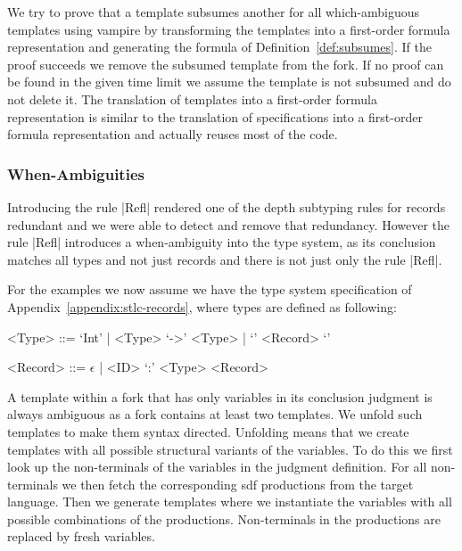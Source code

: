 We try to prove that a template subsumes another for all
which-ambiguous templates using vampire by transforming the templates
into a first-order formula representation and generating the formula
of Definition~\ref{def:subsumes}. If the proof succeeds we remove the
subsumed template from the fork. If no proof can be found in the given
time limit we assume the template is not subsumed and do not delete
it. The translation of templates into a first-order formula
representation is similar to the translation of specifications into a
first-order formula representation and actually reuses most of the
code.

\subsubsection{When-Ambiguities}
Introducing the rule \code|Refl| rendered one of the depth subtyping
rules for records redundant and we were able to detect and remove that
redundancy. However the rule \code|Refl| introduces a when-ambiguity
into the type system, as its conclusion matches all types and not just
records and there is not just only the rule \code|Refl|.

For the examples we now assume we have the type system specification
of Appendix~\ref{appendix:stlc-records}, where types are defined as
following:

\begin{grammar}
  <Type> ::= `Int' | <Type> `->' <Type> | `{' <Record> `}'

  <Record> ::= $\epsilon$ | <ID> `:' <Type> <Record>
\end{grammar}

A template within a fork that has only variables in its conclusion
judgment is always ambiguous as a fork contains at least two
templates. We unfold such templates to make them syntax
directed. Unfolding means that we create templates with all possible
structural variants of the variables. To do this we first look up the
non-terminals of the variables in the judgment definition. For all
non-terminals we then fetch the corresponding \gls{sdf} productions
from the target language. Then we generate templates where we
instantiate the variables with all possible combinations of the
productions. Non-terminals in the productions are replaced by fresh
variables.

